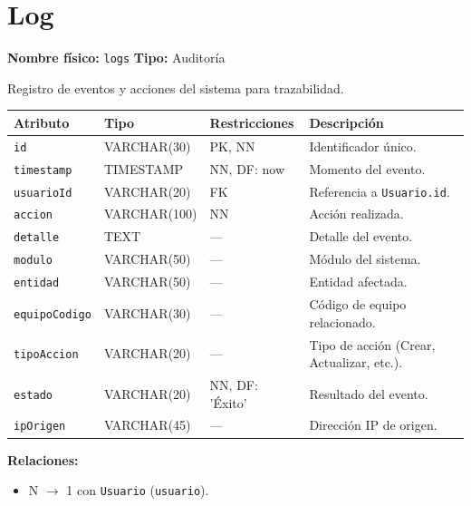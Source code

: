 \documentclass[12pt,a4paper]{article}
\newenvironment{tabladesc}[3]{%
  \section{#1}
  \textbf{Nombre físico:} \texttt{#2} \hfill \textbf{Tipo:} #3\par
  \medskip
}{%
  \bigskip
}
\begin{document}
\begin{tabladesc}{Log}{logs}{Auditoría}

Registro de eventos y acciones del sistema para trazabilidad.

\bigskip
\begin{longtable}{L{3.5cm} L{2.5cm} L{2cm} L{7.5cm}}
\toprule
\textbf{Atributo} & \textbf{Tipo} & \textbf{Restricciones} & \textbf{Descripción} \\
\midrule
\endhead
\bottomrule
\endfoot
\texttt{id}          & VARCHAR(30)  & PK, NN & Identificador único. \\
\texttt{timestamp}   & TIMESTAMP    & NN, DF: now & Momento del evento. \\
\texttt{usuarioId}   & VARCHAR(20)  & FK     & Referencia a \texttt{Usuario.id}. \\
\texttt{accion}      & VARCHAR(100) & NN     & Acción realizada. \\
\texttt{detalle}     & TEXT         & ---    & Detalle del evento. \\
\texttt{modulo}      & VARCHAR(50)  & ---    & Módulo del sistema. \\
\texttt{entidad}     & VARCHAR(50)  & ---    & Entidad afectada. \\
\texttt{equipoCodigo}& VARCHAR(30)  & ---    & Código de equipo relacionado. \\
\texttt{tipoAccion}  & VARCHAR(20)  & ---    & Tipo de acción (Crear, Actualizar, etc.). \\
\texttt{estado}      & VARCHAR(20)  & NN, DF: 'Éxito' & Resultado del evento. \\
\texttt{ipOrigen}    & VARCHAR(45)  & ---    & Dirección IP de origen. \\
\bottomrule
\end{longtable}

\textbf{Relaciones:}
\begin{itemize}[nosep]
  \item N $\rightarrow$ 1 con \texttt{Usuario} (\texttt{usuario}).
\end{itemize}
\end{tabladesc}
\end{document}
